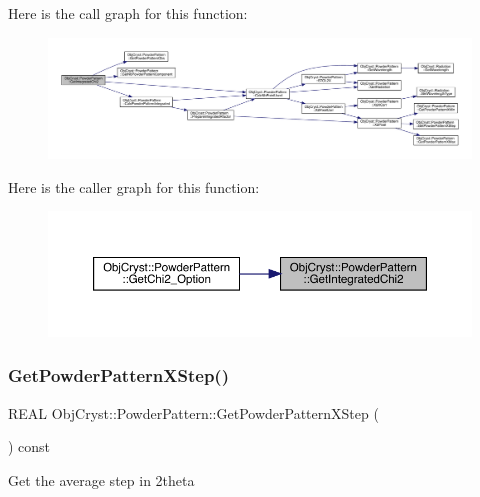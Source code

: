 Here is the call graph for this function\+:
\nopagebreak
\begin{figure}[H]
\begin{center}
\leavevmode
\includegraphics[width=350pt]{class_obj_cryst_1_1_powder_pattern_a12ffd532da8462d03b56cc8e2be210ba_cgraph}
\end{center}
\end{figure}
Here is the caller graph for this function\+:
\nopagebreak
\begin{figure}[H]
\begin{center}
\leavevmode
\includegraphics[width=350pt]{class_obj_cryst_1_1_powder_pattern_a12ffd532da8462d03b56cc8e2be210ba_icgraph}
\end{center}
\end{figure}
\mbox{\label{class_obj_cryst_1_1_powder_pattern_a6c86d0b0a22155319a212bfb4629c9dd}} 
\subsubsection{\texorpdfstring{GetPowderPatternXStep()}{GetPowderPatternXStep()}}
{\footnotesize\ttfamily R\+E\+AL Obj\+Cryst\+::\+Powder\+Pattern\+::\+Get\+Powder\+Pattern\+X\+Step (\begin{DoxyParamCaption}{ }\end{DoxyParamCaption}) const}

Get the average step in 2theta

